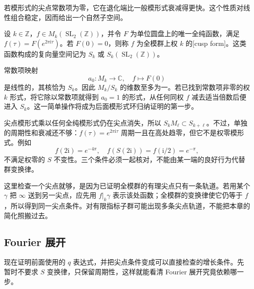 若模形式的尖点常数项为零，它在退化端比一般模形式衰减得更快。这个性质对线性组合稳定，因而给出一个自然子空间。

\begin{definition}\label{b3:def:23-cusp-form}
设 \(k\in\mathbb Z\)，\(f\in M_k(\operatorname{SL}_2(\mathbb Z))\)，并令 \(F\) 为单位圆盘上的唯一全纯函数，满足 \(f(\tau)=F(e^{2\pi\mathrm{i}\tau})\)。若 \(F(0)=0\)，则称 \(f\) 为全模群上权 \(k\) 的[cusp form]。这类函数构成的复向量空间记为 \(S_k\) 或 \(S_k(\operatorname{SL}_2(\mathbb Z))\)。
\end{definition}

常数项映射
\[
 a_0:M_k\longrightarrow\mathbb C,\quad f\longmapsto F(0)
\]
是线性的，其核恰为 \(S_k\)。因此 \(M_k/S_k\) 的维数至多为一。若已找到常数项非零的权 \(k\) 形式，将它除以常数项就得到 \(a_0=1\) 的形式，从任何同权 \(f\) 减去适当倍数后便进入 \(S_k\)。这一简单操作将成为后面模形式环归纳证明的第一步。

尖点模形式乘以任何全纯模形式仍在尖点消失，所以 \(S_kM_\ell\subset S_{k+\ell}\)。不过，单独的周期性和衰减还不够：\(f(\tau)=e^{2\pi\mathrm{i}\tau}\) 周期一且在高处趋零，但它不是权零模形式。例如
\[
 f(2\mathrm{i})=e^{-4\pi},\quad
 f(S(2\mathrm{i}))=f(\mathrm{i}/2)=e^{-\pi},
\]
不满足权零的 \(S\) 不变性。三个条件必须一起核对，不能由某一端的良好行为代替群变换律。

这里检查一个尖点就够，是因为已证明全模群的有理尖点只有一条轨道。若用某个 \(\gamma\) 把 \(\infty\) 送到另一尖点，应先用 \(f|_k\gamma\) 表示该处函数；全模群的变换律使它仍等于 \(f\)，所以得到同一尖点条件。对有限指标子群可能出现多条尖点轨道，不能把本章的简化照搬过去。

\subsection{Fourier 展开}
\label{b3:subsec:230304}

现在证明前面使用的 \(q\) 表达式，并把尖点条件变成可以直接检查的增长条件。先暂时不要求 \(S\) 变换律，只保留周期性，这样就能看清 Fourier 展开究竟依赖哪一步。

